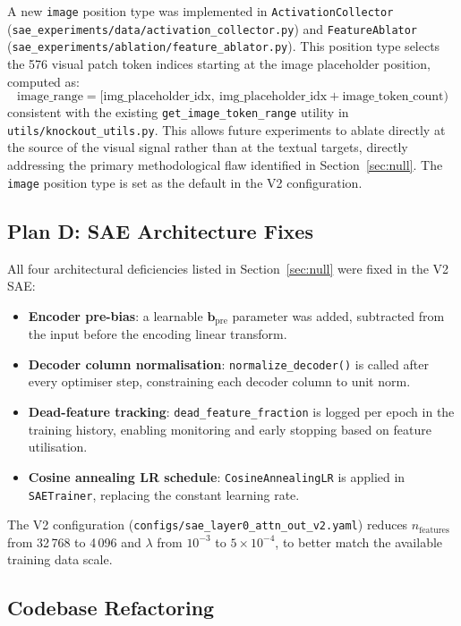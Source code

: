 \documentclass[11pt,a4paper]{article}
\begin{document}
A new \texttt{image} position type was implemented in \texttt{ActivationCollector}
(\texttt{sae\_experiments/data/activation\_collector.py}) and \texttt{FeatureAblator}
(\texttt{sae\_experiments/ablation/feature\_ablator.py}).
This position type selects the 576 visual patch token indices starting at the image placeholder
position, computed as:
\begin{equation}
  \text{image\_range} = [\text{img\_placeholder\_idx},\ \text{img\_placeholder\_idx} +
    \text{image\_token\_count})
\end{equation}
consistent with the existing \texttt{get\_image\_token\_range} utility in
\texttt{utils/knockout\_utils.py}.
This allows future experiments to ablate directly at the source of the visual signal rather than
at the textual targets, directly addressing the primary methodological flaw identified in
Section~\ref{sec:null}.
The \texttt{image} position type is set as the default in the V2 configuration.

\subsection{Plan D: SAE Architecture Fixes}

All four architectural deficiencies listed in Section~\ref{sec:null} were fixed in the V2 SAE:
\begin{itemize}[noitemsep]
  \item \textbf{Encoder pre-bias}: a learnable $\mathbf{b}_{\mathrm{pre}}$ parameter was added,
    subtracted from the input before the encoding linear transform.
  \item \textbf{Decoder column normalisation}: \texttt{normalize\_decoder()} is called after every
    optimiser step, constraining each decoder column to unit norm.
  \item \textbf{Dead-feature tracking}: \texttt{dead\_feature\_fraction} is logged per epoch in the
    training history, enabling monitoring and early stopping based on feature utilisation.
  \item \textbf{Cosine annealing LR schedule}: \texttt{CosineAnnealingLR} is applied in
    \texttt{SAETrainer}, replacing the constant learning rate.
\end{itemize}
The V2 configuration (\texttt{configs/sae\_layer0\_attn\_out\_v2.yaml}) reduces $n_{\mathrm{features}}$
from 32\,768 to 4\,096 and $\lambda$ from $10^{-3}$ to $5 \times 10^{-4}$, to better match
the available training data scale.

\subsection{Codebase Refactoring}
\end{document}
